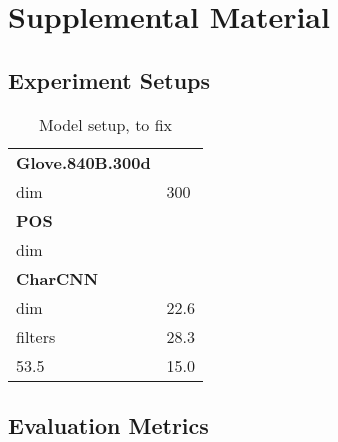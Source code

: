 \section{Supplemental Material}
\label{sc:supplemental}

\subsection{Experiment Setups}
\label{ssec:exp}

\begin{table}[!h]
\begin{center}{\small
\setlength{\tabcolsep}{3pt}
\begin{tabular}{ll}
\toprule
\textbf{Glove.840B.300d}     & \\
dim       & 300       \\ \hline
\textbf{POS}       & \\
dim       &             \\ \hline
\textbf{CharCNN} & \\
dim & 22.6       \\
filters & 28.3       \\
53.5       & 15.0       \\ \bottomrule
\end{tabular}}
\end{center}
\caption{\label{tbl:model_setup} Model setup, to fix}
\end{table}


\subsection{Evaluation Metrics}
\label{ssec:eval}

